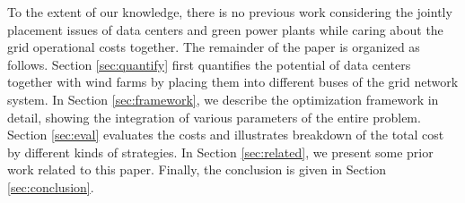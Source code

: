To the extent of our knowledge, there is no previous work considering the jointly placement issues of data centers and green power plants while caring about the grid operational costs together. The remainder of the paper is organized as follows. Section \ref{sec:quantify} first quantifies the potential of data centers together with wind farms by placing them into different buses of the grid network system. In Section \ref{sec:framework}, we describe the optimization framework in detail, showing the integration of various parameters of the entire problem. Section \ref{sec:eval} evaluates the costs and illustrates breakdown of the total cost by different kinds of strategies. In Section \ref{sec:related}, we present some prior work related to this paper. Finally, the conclusion is given in Section \ref{sec:conclusion}.



